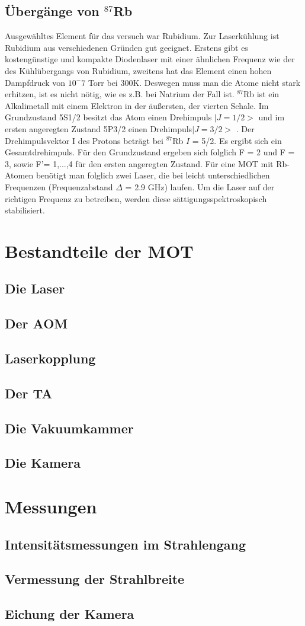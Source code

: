 \documentclass[12pt,a4paper]{article}
\begin{document}
  \subsection{Übergänge von ${}^{87}$Rb}
  Ausgewähltes Element für das versuch war Rubidium. Zur Laserkühlung ist Rubidium aus verschiedenen Gründen gut geeignet. Erstens gibt es kostengünstige und kompakte Diodenlaser mit einer ähnlichen Frequenz wie der des Kühlübergangs von Rubidium, zweitens hat das Element einen hohen Dampfdruck von ${10^-7}$ Torr bei 300K. Deswegen muss man die Atome nicht stark erhitzen, ist es nicht nötig, wie es z.B. bei Natrium der Fall ist.
${}^{87}$Rb ist ein Alkalimetall mit einem Elektron in der äußersten, der vierten Schale. Im Grundzustand 5S1/2 besitzt das Atom einen Drehimpuls
   ${|J = 1/2>}$ und im ersten angeregten Zustand 5P3/2 einen Drehimpuls${ |J = 3/2>}$ . Der Drehimpulsvektor I des Protons beträgt bei ${}^{87}$Rb $I$ = 5/2. Es ergibt sich ein Gesamtdrehimpuls. Für den Grundzustand ergeben sich folglich F = 2 und F = 3, sowie F'= 1,...,4 für den ersten angeregten Zustand.
Für eine MOT mit Rb-Atomen benötigt man folglich zwei Laser, die bei leicht unterschiedlichen Frequenzen (Frequenzabstand ${\Delta}$ = 2.9 GHz) laufen. Um die Laser auf der richtigen Frequenz zu betreiben, werden diese sättigungsspektroskopisch stabilisiert.
\section{Bestandteile der MOT}
  \subsection{Die Laser}
  \subsection{Der AOM}
  \subsection{Laserkopplung}
  \subsection{Der TA}
  \subsection{Die Vakuumkammer}
  \subsection{Die Kamera}
\section{Messungen}
  \subsection{Intensitätsmessungen im Strahlengang}
  \subsection{Vermessung der Strahlbreite}
  \subsection{Eichung der Kamera}
\end{document}
